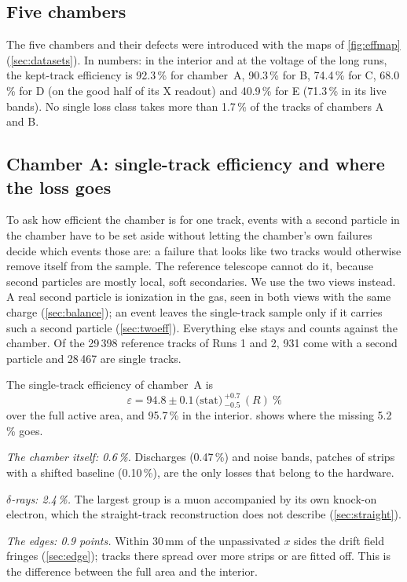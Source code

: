 \subsection{Five chambers}\label{sec:fleet}
The five chambers and their defects were introduced with the maps of \cref{fig:effmap} (\cref{sec:datasets}). In
numbers: in the interior and at the voltage of the long runs, the kept-track efficiency is 92.3\,\% for chamber~A,
90.3\,\% for B, 74.4\,\% for C, 68.0\,\% for D (on the good half of its X readout) and 40.9\,\% for E (71.3\,\% in its
live bands). No single loss class takes more than 1.7\,\% of the tracks of chambers A and B.

\subsection{Chamber A: single-track efficiency and where the loss goes}\label{sec:single}
To ask how efficient the chamber is for one track, events with a second particle in the chamber have to be set
aside without letting the chamber's own failures decide which events those are: a failure that looks like two tracks
would otherwise remove itself from the sample. The reference telescope cannot do it, because second particles are
mostly local, soft secondaries. We use the two views instead. A real second particle is ionization in the gas, seen in
both views with the same charge (\cref{sec:balance}); an event leaves the single-track sample only if it carries such a
second particle (\cref{sec:twoeff}). Everything else stays and counts against the chamber. Of the 29\,398 reference
tracks of Runs 1 and 2, 931 come with a second particle and 28\,467 are single tracks.

The single-track efficiency of chamber~A is
\[ \varepsilon=94.8\pm0.1\,\text{(stat)}\,^{+0.7}_{-0.5}\,(R)\ \%\]
over the full active area, and 95.7\,\% in the interior.  shows where the missing 5.2\,\% goes.

\emph{The chamber itself: 0.6\,\%.} Discharges (0.47\,\%) and noise bands, patches of strips with a shifted baseline
(0.10\,\%), are the only losses that belong to the hardware.

\emph{$\delta$-rays: 2.4\,\%.} The largest group is a muon accompanied by its own knock-on electron, which the
straight-track reconstruction does not describe (\cref{sec:straight}).

\emph{The edges: 0.9 points.} Within 30\,mm of the unpassivated $x$ sides the drift field fringes
(\cref{sec:edge}); tracks there spread over more strips or are fitted off. This is the difference between the full
area and the interior.

